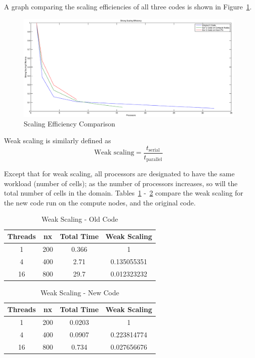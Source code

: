 \documentclass{article}
\begin{document}
A graph comparing the scaling efficiencies of all three codes is shown in Figure~\ref{fig:seff}. \\
\begin{figure}[here]
 \centering
 \includegraphics[width=0.9\linewidth]{scaleff.eps}
 \caption{Scaling Efficiency Comparison}
 \label{fig:seff}
\end{figure}
\clearpage
Weak scaling is similarly defined as \\
\begin{equation}
\textrm{Weak scaling} = \frac{t_{\textrm{serial}}}{t_{\textrm{parallel}}}
\end{equation}

Except that for weak scaling, all processors are designated to have the same workload (number of cells); as the number of processors increases, so will the total number of cells in the domain. Tables~\ref{ws_old} -~\ref{ws_new} compare the weak scaling for the new code run on the compute nodes, and the original code. \\

\begin{table}[here]
 \centering
  \begin{tabular}{ | c | c | c | c | }
 \hline
 Threads & nx & Total Time & Weak Scaling \\ \hline
1 &	200 &	0.366 &	1 \\
4 &	400 &	2.71 &	0.135055351 \\
16 &	800 &	29.7 &	0.012323232 \\ \hline
\end{tabular}
 \caption{Weak Scaling - Old Code}
 \label{ws_old}
\end{table}
\begin{table}[here]
 \centering
  \begin{tabular}{ | c | c | c | c | }
 \hline
 Threads & nx & Total Time & Weak Scaling \\ \hline
1 &	200 &	0.0203 &	1 \\
4 &	400 &	0.0907 &	0.223814774 \\
16 &	800 &	0.734 &	0.027656676 \\ \hline
\end{tabular}
 \caption{Weak Scaling - New Code}
 \label{ws_new}
\end{table}
\clearpage
\end{document}
